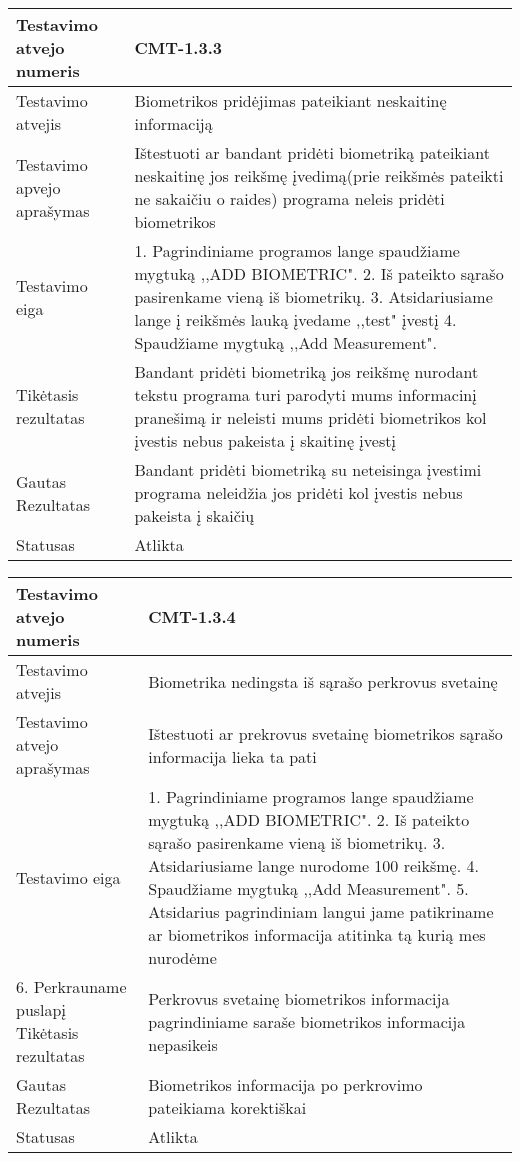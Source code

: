 \documentclass[oneside]{VUMIFPSkursinis}
\begin{document}
\begin{center}
    \begin{tabular}{ |p{5cm}|p{13cm}|}
    \hline
    	Testavimo atvejo numeris & CMT-1.3.3 \\ \hline
    	Testavimo atvejis &Biometrikos pridėjimas pateikiant neskaitinę informaciją \\ \hline
	Testavimo apvejo aprašymas & Ištestuoti ar bandant pridėti biometriką pateikiant neskaitinę jos reikšmę įvedimą(prie reikšmės pateikti ne sakaičiu o raides) programa neleis pridėti biometrikos  \\ \hline
	Testavimo eiga & 1. Pagrindiniame programos lange spaudžiame mygtuką ,,ADD BIOMETRIC". 
				2. Iš pateikto sąrašo pasirenkame vieną iš biometrikų. 
				3. Atsidariusiame lange į reikšmės lauką įvedame ,,test" įvestį
				4. Spaudžiame mygtuką ,,Add Measurement".\\ \hline
	Tikėtasis rezultatas & Bandant pridėti biometriką jos reikšmę nurodant tekstu programa turi parodyti mums informacinį pranešimą ir neleisti mums pridėti biometrikos kol įvestis nebus pakeista į skaitinę įvestį \\ \hline
	Gautas Rezultatas & Bandant pridėti biometriką su neteisinga įvestimi programa neleidžia jos pridėti kol įvestis nebus pakeista į skaičių \\ \hline
	Statusas & Atlikta \\ \hline
    \hline
    \end{tabular}
\end{center}

\begin{center}
    \begin{tabular}{ |p{5cm}|p{13cm}|}
    \hline
        Testavimo atvejo numeris & CMT-1.3.4  \\ \hline
        Testavimo atvejis & Biometrika nedingsta iš sąrašo perkrovus svetainę  \\ \hline
        Testavimo atvejo aprašymas & Ištestuoti ar prekrovus svetainę biometrikos sąrašo informacija lieka ta pati  \\ \hline
        Testavimo eiga &  1. Pagrindiniame programos lange spaudžiame mygtuką ,,ADD BIOMETRIC". 
				2. Iš pateikto sąrašo pasirenkame vieną iš biometrikų. 
				3. Atsidariusiame lange nurodome 100 reikšmę.
				4. Spaudžiame mygtuką ,,Add Measurement".
				5. Atsidarius pagrindiniam langui jame patikriname ar biometrikos informacija atitinka tą kurią mes nurodėme\\ \hline
				6. Perkrauname puslapį
        Tikėtasis rezultatas &  Perkrovus svetainę biometrikos informacija pagrindiniame saraše biometrikos informacija nepasikeis\\ \hline
        Gautas Rezultatas & Biometrikos informacija po perkrovimo pateikiama korektiškai  \\ \hline
        Statusas & Atlikta  \\ \hline
    \hline
    \end{tabular}
\end{center}
\end{document}
